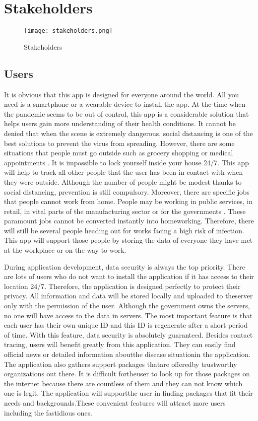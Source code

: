 \section{Stakeholders}
  \begin{figure}
    \centering
    \texttt{[image: stakeholders.png]}    
    \caption{Stakeholders}
  \end{figure}

  \subsection{Users}
    \par It is obvious that this app is designed for everyone around the world. All you need is a smartphone or a wearable device to install the app. At the time when the pandemic seems to be out of control, this app is a considerable solution that helps users gain more understanding of their health conditions. It cannot be denied that when the scene is extremely dangerous, social distancing is one of the best solutions to prevent the virus from spreading. However, there are some situations that people must go outside such as grocery shopping or medical appointments \parencite{Stake1}. It is impossible to lock yourself inside your house 24/7. This app will help to track all other people that the user has been in contact with when they were outside. Although the number of people might be modest thanks to social distancing, prevention is still compulsory. Moreover, there are specific jobs that people cannot work from home. People may be working in public services, in retail, in vital parts of the manufacturing sector or for the governments \parencite{Stake2}. These paramount jobs cannot be converted instantly into homeworking. Therefore, there will still be several people heading out for works facing a high risk of infection. This app will support those people by storing the data of everyone they have met at the workplace or on the way to work.
    \par During  application  development,  data  security  is  always  the  top  priority. There are lots of users who do not want to install the application if it has access to their location 24/7. Therefore, the application is designed perfectly to protect their privacy. All information and data will be stored locally and uploaded to theserver only with the permission of the user. Although the government owns the servers, no one will have access to the data in servers. The most important feature is that each user has their own unique ID and this ID is regenerate after a short period of time. With  this  feature,  data  security  is  absolutely  guaranteed.  Besides  contact  tracing, users will benefit greatly from this application. They can easily find official news or detailed information aboutthe disease situationin the application. The application also gathers support packages thatare offeredby trustworthy organizations out there. It is difficult fortheuser to look up for those packages on the internet because there are countless of them and they can not know which one is legit. The application will supportthe  user  in  finding  packages  that  fit  their  needs  and  backgrounds.These convenient features will attract more users including the fastidious ones.

